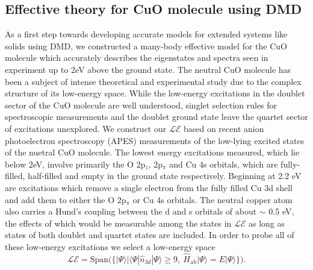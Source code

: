\documentclass{article}
\begin{document}
\subsection{Effective theory for CuO molecule using DMD}
As a first step towards developing accurate models for extended systems like solids using DMD, we constructed a many-body effective model for the CuO molecule which accurately describes the eigenstates and spectra seen in experiment up to 2eV above the ground state.
The neutral CuO molecule has been a subject of intense theoretical and experimental study due to the complex structure of its low-energy space.
While the low-energy excitations in the doublet sector of the CuO molecule are well understood, singlet selection rules for spectroscopic measurements and the doublet ground state leave the quartet sector of excitations unexplored.
We construct our $\mathcal{LE}$ based on recent anion photoelectron spectroscopy (APES) measurements of the low-lying excited states of the nuetral CuO molecule. 
The lowest energy excitations measured, which lie below 2eV, involve primarily the O 2p$_z$, 2p$_\pi$ and Cu 4s orbitals, which are fully-filled, half-filled and empty in the ground state respectively.
Beginning at 2.2 eV are excitations which remove a single electron from the fully filled Cu 3d shell and add them to either the O 2p$_\pi$ or Cu 4s orbitals.
The neutral copper atom also carries a Hund's coupling between the d and s orbitals of about $\sim$ 0.5 eV, the effects of which would be measurable among the states in $\mathcal{LE}$ as long as states of both doublet and quartet states are included.
In order to probe all of these low-energy excitations we select a low-energy space
\begin{equation}
\mathcal{LE} = \text{Span(}\{ |\Psi \rangle | \langle \Psi | \hat{n}_{3d} | \Psi \rangle \ge 9,\ \hat{H}_\text{ab}|\Psi\rangle = E |\Psi\rangle \}\text{)}.
\label{eq:LE}
\end{equation}
\end{document}
